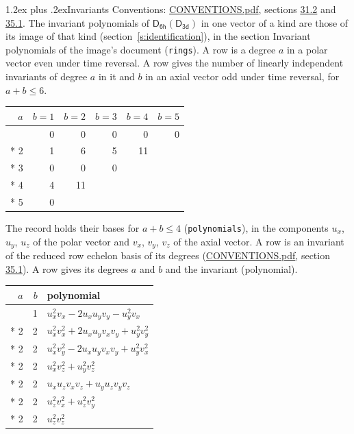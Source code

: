 \documentclass[10pt,a4paper]{article}
\makeatletter
\renewcommand\section{\@startsection{section}{1}{\z@}{-3ex plus -1ex minus -.2ex}%
  {1.2ex plus .2ex}{\normalfont\large\sffamily\bfseries\color{parttitle}}}
\numberwithin{equation}{section}
\newcommand{\grp}[1]{\mathsf{#1}}
\makeatother
\begin{document}
\section{Invariants}\label{s:invariants}
Conventions: \href{../../CONVENTIONS.pdf}{CONVENTIONS.pdf}, sections \href{../../CONVENTIONS.pdf\#conv.31.2}{31.2} and \href{../../CONVENTIONS.pdf\#conv.35.1}{35.1}.
The invariant polynomials of $\grp{D_{6h}}(\grp{D_{3d}})$ in one vector of a kind are those of its image of that kind (section~\ref{s:identification}), in the section Invariant polynomials of the image's document (\texttt{rings}).
\leavevmode\label{n:index.degree.polar}\label{n:index.degree.axial}A row is a degree $a$ in a polar vector even under time reversal. A row gives the number of linearly independent invariants of degree $a$ in it and $b$ in an axial vector odd under time reversal, for $a + b \le 6$.
{\small\begin{longtable}{@{}rrrrrr@{}}\toprule
$a$ & $b = 1$ & $b = 2$ & $b = 3$ & $b = 4$ & $b = 5$\\\midrule\endhead
\bottomrule\endfoot\endlastfoot
1 & 0 & 0 & 0 & 0 & 0\\*
2 & 1 & 6 & 5 & 11 & \\*
3 & 0 & 0 & 0 &  & \\*
4 & 4 & 11 &  &  & \\*
5 & 0 &  &  &  & \\
\bottomrule\end{longtable}}
\leavevmode\label{n:local.component.polar}\label{n:local.component.axial}The record holds their bases for $a + b \le 4$ (\texttt{polynomials}), in the components $u_{x}$, $u_{y}$, $u_{z}$ of the polar vector and $v_{x}$, $v_{y}$, $v_{z}$ of the axial vector. \label{n:head.polynomial}A row is an invariant of the reduced row echelon basis of its degrees (\href{../../CONVENTIONS.pdf}{CONVENTIONS.pdf}, section \href{../../CONVENTIONS.pdf\#conv.35.1}{35.1}). A row gives its degrees $a$ and $b$ and the invariant (polynomial).
{\small\renewcommand{\arraystretch}{1.2}\begin{longtable}{@{}rrl@{}}\toprule
$a$ & $b$ & polynomial\\\midrule\endhead
\bottomrule\endfoot\endlastfoot
2 & 1 & $u_{x}^{2}v_{x} - 2u_{x}u_{y}v_{y} - u_{y}^{2}v_{x}$\\*
2 & 2 & $u_{x}^{2}v_{x}^{2} + 2u_{x}u_{y}v_{x}v_{y} + u_{y}^{2}v_{y}^{2}$\\*
2 & 2 & $u_{x}^{2}v_{y}^{2} - 2u_{x}u_{y}v_{x}v_{y} + u_{y}^{2}v_{x}^{2}$\\*
2 & 2 & $u_{x}^{2}v_{z}^{2} + u_{y}^{2}v_{z}^{2}$\\*
2 & 2 & $u_{x}u_{z}v_{x}v_{z} + u_{y}u_{z}v_{y}v_{z}$\\*
2 & 2 & $u_{z}^{2}v_{x}^{2} + u_{z}^{2}v_{y}^{2}$\\*
2 & 2 & $u_{z}^{2}v_{z}^{2}$\\
\bottomrule\end{longtable}}
\end{document}
